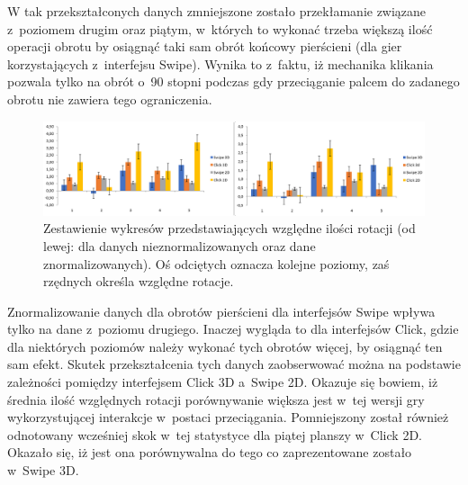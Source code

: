 \documentclass[a4paper,12pt,numbers=noenddot]{report}
\begin{document}
W tak przekształconych danych zmniejszone zostało przekłamanie związane z~poziomem drugim oraz piątym, w~których to wykonać trzeba większą ilość operacji obrotu by osiągnąć taki sam obrót końcowy pierścieni (dla gier korzystających z~interfejsu Swipe). Wynika to z~faktu, iż mechanika klikania pozwala tylko na obrót o~90 stopni podczas gdy przeciąganie palcem do zadanego obrotu nie zawiera tego ograniczenia. 

\begin{figure}[h!]
	\centering
  	\includegraphics[width=\linewidth]{diag/rel_mean_rotationsNorm.png}
	\caption{Zestawienie wykresów przedstawiających względne ilości rotacji (od lewej: dla danych nieznormalizowanych oraz dane znormalizowanych). Oś odciętych oznacza kolejne poziomy, zaś rzędnych określa względne rotacje.}
	\label{fig:diag:rel:mean_RotationsNorm}
\end{figure}

Znormalizowanie danych dla obrotów pierścieni dla interfejsów Swipe wpływa tylko na dane z~poziomu drugiego. Inaczej wygląda to dla interfejsów Click, gdzie dla niektórych poziomów należy wykonać tych obrotów więcej, by osiągnąć ten sam efekt. Skutek przekształcenia tych danych zaobserwować można na podstawie zależności pomiędzy interfejsem Click 3D a~Swipe 2D. Okazuje się bowiem, iż średnia ilość względnych rotacji porównywanie większa jest w~tej wersji gry wykorzystującej interakcje w~postaci przeciągania. Pomniejszony został również odnotowany wcześniej skok w~tej statystyce dla piątej planszy w~Click 2D. Okazało się, iż jest ona porównywalna do tego co zaprezentowane zostało w~Swipe 3D.
\end{document}
